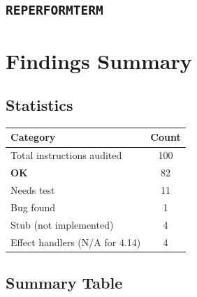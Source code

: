 \documentclass[11pt,a4paper]{article}
\newif\ifinternalaudit
\newcommand{\instruction}[2]{%
  \subsection{\texttt{#1}}%
  \label{instr:#2}%
}
\newcommand{\statusok}{\textbf{\textcolor{green!50!black}{OK}}\xspace}
\newcommand{\statusstub}{\textbf{\textcolor{gray}{STUB}}\xspace}
\newcommand{\risklow}{\textcolor{green!50!black}{\textbf{Low}}\xspace}
\begin{document}
\instruction{REPERFORMTERM}{reperformterm}

\ifinternalaudit
\paragraph{Analysis.} Same as \texttt{PERFORM}.  Returns error.

\paragraph{Status.} \statusstub

\paragraph{Risk.} \risklow
\fi


\ifinternalaudit
\section{Findings Summary}
\label{sec:summary}

\subsection{Statistics}

\begin{center}
\begin{tabular}{lc}
\toprule
\textbf{Category} & \textbf{Count} \\
\midrule
Total instructions audited & 100 \\
\statusok & 82 \\
Needs test & 11 \\
Bug found & 1 \\
Stub (not implemented) & 4 \\
Effect handlers (N/A for 4.14) & 4 \\
\bottomrule
\end{tabular}
\end{center}

\subsection{Summary Table}
\end{document}
